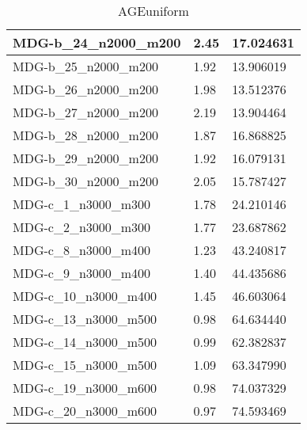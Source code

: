 \documentclass[10pt,a4paper]{article}
\begin{document}
\begin{table}[]
\begin{tabular}{lll}
		\multicolumn{1}{|l|}{MDG-b\_24\_n2000\_m200} & \multicolumn{1}{l|}{2.45}          & \multicolumn{1}{l|}{17.024631}       \\ \hline
		\multicolumn{1}{|l|}{MDG-b\_25\_n2000\_m200} & \multicolumn{1}{l|}{1.92}          & \multicolumn{1}{l|}{13.906019}       \\ \hline
		\multicolumn{1}{|l|}{MDG-b\_26\_n2000\_m200} & \multicolumn{1}{l|}{1.98}          & \multicolumn{1}{l|}{13.512376}       \\ \hline
		\multicolumn{1}{|l|}{MDG-b\_27\_n2000\_m200} & \multicolumn{1}{l|}{2.19}          & \multicolumn{1}{l|}{13.904464}       \\ \hline
		\multicolumn{1}{|l|}{MDG-b\_28\_n2000\_m200} & \multicolumn{1}{l|}{1.87}          & \multicolumn{1}{l|}{16.868825}       \\ \hline
		\multicolumn{1}{|l|}{MDG-b\_29\_n2000\_m200} & \multicolumn{1}{l|}{1.92}          & \multicolumn{1}{l|}{16.079131}       \\ \hline
		\multicolumn{1}{|l|}{MDG-b\_30\_n2000\_m200} & \multicolumn{1}{l|}{2.05}          & \multicolumn{1}{l|}{15.787427}       \\ \hline
		\multicolumn{1}{|l|}{MDG-c\_1\_n3000\_m300}  & \multicolumn{1}{l|}{1.78}          & \multicolumn{1}{l|}{24.210146}       \\ \hline
		\multicolumn{1}{|l|}{MDG-c\_2\_n3000\_m300}  & \multicolumn{1}{l|}{1.77}          & \multicolumn{1}{l|}{23.687862}       \\ \hline
		\multicolumn{1}{|l|}{MDG-c\_8\_n3000\_m400}  & \multicolumn{1}{l|}{1.23}          & \multicolumn{1}{l|}{43.240817}       \\ \hline
		\multicolumn{1}{|l|}{MDG-c\_9\_n3000\_m400}  & \multicolumn{1}{l|}{1.40}          & \multicolumn{1}{l|}{44.435686}       \\ \hline
		\multicolumn{1}{|l|}{MDG-c\_10\_n3000\_m400} & \multicolumn{1}{l|}{1.45}          & \multicolumn{1}{l|}{46.603064}       \\ \hline
		\multicolumn{1}{|l|}{MDG-c\_13\_n3000\_m500} & \multicolumn{1}{l|}{0.98}          & \multicolumn{1}{l|}{64.634440}       \\ \hline
		\multicolumn{1}{|l|}{MDG-c\_14\_n3000\_m500} & \multicolumn{1}{l|}{0.99}          & \multicolumn{1}{l|}{62.382837}       \\ \hline
		\multicolumn{1}{|l|}{MDG-c\_15\_n3000\_m500} & \multicolumn{1}{l|}{1.09}          & \multicolumn{1}{l|}{63.347990}       \\ \hline
		\multicolumn{1}{|l|}{MDG-c\_19\_n3000\_m600} & \multicolumn{1}{l|}{0.98}          & \multicolumn{1}{l|}{74.037329}       \\ \hline
		\multicolumn{1}{|l|}{MDG-c\_20\_n3000\_m600} & \multicolumn{1}{l|}{0.97}          & \multicolumn{1}{l|}{74.593469}       \\ \hline
	\end{tabular}
	\caption{AGEuniform}
	\label{table:AGEuniform}
\end{table}
\end{document}
